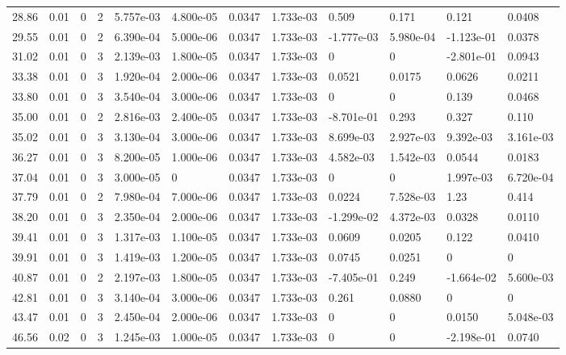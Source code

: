\documentclass[preview]{standalone}
\begin{document}
{{\begin{tabular}{L{1.2cm}C{1.2cm} C{0.3cm}C{0.5cm} C{1.4cm}C{1.4cm} C{1.4cm}C{1.4cm} C{1.6cm}C{1.6cm} C{1.6cm}C{1.6cm}}
  28.86  &  0.01  & 0     &  2 &  5.757e-03  & 4.800e-05  &  0.0347&   1.733e-03& 0.509 & 0.171   &  0.121 & 0.0408  \\ 
  29.55  &  0.01  & 0     &  2 &  6.390e-04  & 5.000e-06  &  0.0347&   1.733e-03& -1.777e-03 & 5.980e-04   &  -1.123e-01 & 0.0378  \\ 
  31.02  &  0.01  & 0     &  3 &  2.139e-03  & 1.800e-05  &  0.0347&   1.733e-03& 0 & 0   &  -2.801e-01 & 0.0943  \\ 
  33.38  &  0.01  & 0     &  3 &  1.920e-04  & 2.000e-06  &  0.0347&   1.733e-03& 0.0521 & 0.0175   &  0.0626 & 0.0211  \\ 
  33.80  &  0.01  & 0     &  3 &  3.540e-04  & 3.000e-06  &  0.0347&   1.733e-03& 0 & 0   &  0.139 & 0.0468  \\ 
  35.00  &  0.01  & 0     &  2 &  2.816e-03  & 2.400e-05  &  0.0347&   1.733e-03& -8.701e-01 & 0.293   &  0.327 & 0.110  \\ 
  35.02  &  0.01  & 0     &  3 &  3.130e-04  & 3.000e-06  &  0.0347&   1.733e-03& 8.699e-03 & 2.927e-03   &  9.392e-03 & 3.161e-03  \\ 
  36.27  &  0.01  & 0     &  3 &  8.200e-05  & 1.000e-06  &  0.0347&   1.733e-03& 4.582e-03 & 1.542e-03   &  0.0544 & 0.0183  \\ 
  37.04  &  0.01  & 0     &  3 &  3.000e-05  & 0  &  0.0347&   1.733e-03& 0 & 0   &  1.997e-03 & 6.720e-04  \\ 
  37.79  &  0.01  & 0     &  2 &  7.980e-04  & 7.000e-06  &  0.0347&   1.733e-03& 0.0224 & 7.528e-03   &  1.23 & 0.414  \\ 
  38.20  &  0.01  & 0     &  3 &  2.350e-04  & 2.000e-06  &  0.0347&   1.733e-03& -1.299e-02 & 4.372e-03   &  0.0328 & 0.0110  \\ 
  39.41  &  0.01  & 0     &  3 &  1.317e-03  & 1.100e-05  &  0.0347&   1.733e-03& 0.0609 & 0.0205   &  0.122 & 0.0410  \\ 
  39.91  &  0.01  & 0     &  3 &  1.419e-03  & 1.200e-05  &  0.0347&   1.733e-03& 0.0745 & 0.0251   &  0 & 0  \\ 
  40.87  &  0.01  & 0     &  2 &  2.197e-03  & 1.800e-05  &  0.0347&   1.733e-03& -7.405e-01 & 0.249   &  -1.664e-02 & 5.600e-03  \\ 
  42.81  &  0.01  & 0     &  3 &  3.140e-04  & 3.000e-06  &  0.0347&   1.733e-03& 0.261 & 0.0880   &  0 & 0  \\ 
  43.47  &  0.01  & 0     &  3 &  2.450e-04  & 2.000e-06  &  0.0347&   1.733e-03& 0 & 0   &  0.0150 & 5.048e-03  \\ 
  46.56  &  0.02  & 0     &  3 &  1.245e-03  & 1.000e-05  &  0.0347&   1.733e-03& 0 & 0   &  -2.198e-01 & 0.0740  \\ 
\hline 
\end{tabular} 

}}
\end{document}
